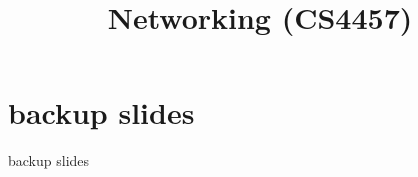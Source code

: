 \date{}
\title{Networking (CS4457)}
\date{}

\begin{frame}
    \titlepage
\end{frame}








\section{backup slides}
\begin{frame}{backup slides}
\end{frame}


